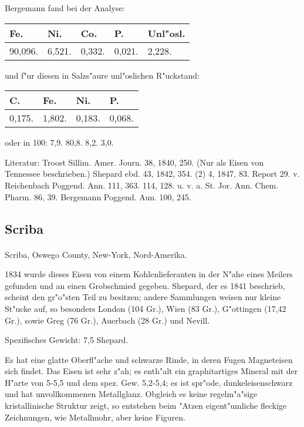 \documentclass[a4paper, 11pt, oneside]{article}
\begin{document}
Bergemann fand bei der Analyse:
\begin{table}[H]
    \centering
    \begin{tabular}{l l l l l}
        Fe. & Ni. & Co. & P. & Unl"osl. \\ \hline
        90,096. & 6,521. & 0,332. & 0,021. & 2,228. \\
    \end{tabular}
\end{table}

und f"ur diesen in Salzs"aure unl"oslichen R"uckstand:
\begin{table}[H]
    \centering
    \begin{tabular}{ l l l l}
        C. & Fe. & Ni. & P. \\ \hline
        0,175. & 1,802. & 0,183. & 0,068. \\
    \end{tabular}
\end{table}

oder in 100: 7,9. 80,8. 8,2. 3,0.

\footnotesize
Literatur: Troost Sillim. Amer. Journ. 38, 1840, 250. (Nur als Eisen von Tennessee beschrieben.) Shepard ebd. 43, 1842, 354. (2) 4, 1847, 83. Report 29. v. Reichenbach Poggend. Ann. 111, 363. 114, 128. u. v. a. St. Jor. Ann. Chem. Pharm. 86, 39. Bergemann Poggend. Aun. 100, 245.

\subsection{Scriba}
\normalsize
\paragraph{}
Scriba, Oswego County, New-York, Nord-Amerika.

1834 wurde dieses Eisen von einem Kohlenlieferanten in der N"ahe eines Meilers gefunden und an einen Grobschmied gegeben. Shepard, der es 1841 beschrieb, scheint den gr"o"sten Teil zu besitzen; andere Sammlungen weisen nur kleine St"ucke auf, so besonders London (104 Gr.), Wien (83 Gr.), G"ottingen (17,42 Gr.), sowie Greg (76 Gr.), Auerbach (28 Gr.) und Nevill.

Spezifisches Gewicht: 7,5 Shepard.

Es hat eine glatte Oberfl"ache und schwarze Rinde, in deren Fugen Magneteisen sich findet. Das Eisen ist sehr z"ah; es enth"alt ein graphitartiges Mineral mit der H"arte von 5-5,5 und dem spez. Gew. 5,2-5,4; es ist spr"ode, dunkeleisenschwarz und hat unvollkommenen Metallglanz. Obgleich es keine regelm"a"sige kristallinische Struktur zeigt, so entstehen beim "Atzen eigent"umliche fleckige Zeichnungen, wie Metallmohr, aber keine Figuren.
\end{document}
